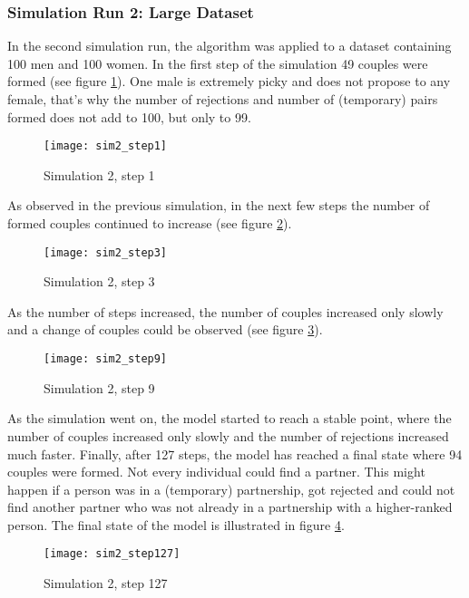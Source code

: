 \clearpage
\subsubsection{Simulation Run 2: Large Dataset}
In the second simulation run, the algorithm was applied to a dataset containing 100 men and 100 women. 
In the first step of the simulation 49 couples were formed (see figure \ref{fig:sim2_step1}). 
One male is extremely picky and does not propose to any female, 
that's why the number of rejections and number of (temporary) pairs formed does not add to 100, but only to 99.
\begin{figure}[H]
  \centering
  \texttt{[image: sim2\_step1]}
	\caption{Simulation 2, step 1}
	\label{fig:sim2_step1}
\end{figure}

As observed in the previous simulation, in the next few steps the number of formed couples continued to increase (see figure \ref{fig:sim2_step3}).
\begin{figure}[H]
  \centering
  \texttt{[image: sim2\_step3]}
	\caption{Simulation 2, step 3}
	\label{fig:sim2_step3}
\end{figure}

As the number of steps increased, the number of couples increased only slowly and a change of couples could be observed (see figure \ref{fig:sim2_step9}).
\begin{figure}[H]
  \centering
  \texttt{[image: sim2\_step9]}
	\caption{Simulation 2, step 9}
	\label{fig:sim2_step9}
\end{figure}

As the simulation went on, the model started to reach a stable point, where the number of couples increased only slowly and the number of rejections increased much faster. 
Finally, after 127 steps, the model has reached a final state where 94 couples were formed. Not every individual could find a partner. This might happen if a person was in a (temporary) partnership, got rejected and could not find another partner who was not already in a partnership with a higher-ranked person.
The final state of the model is illustrated in figure \ref{fig:sim2_step127}.
\begin{figure}[H]
  \centering
  \texttt{[image: sim2\_step127]}
	\caption{Simulation 2, step 127}
	\label{fig:sim2_step127}
\end{figure}

\clearpage
